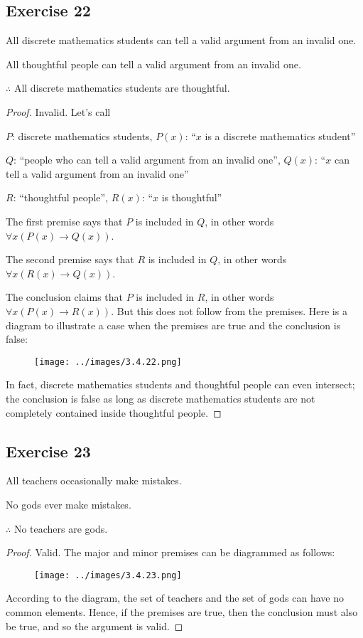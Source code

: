 \documentclass[14pt]{extarticle}
\newcommand{\fa}{\forall}
\begin{document}
\subsection{Exercise 22}
All discrete mathematics students can tell a valid argument from an invalid one.

All thoughtful people can tell a valid argument from an invalid one.

$\therefore$ All discrete mathematics students are thoughtful.

\begin{proof}
    Invalid. Let's call

    $P$: discrete mathematics students, $P(x)$: ``$x$ is a discrete mathematics student''

    $Q$: ``people who can tell a valid argument from an invalid one'', $Q(x)$: ``$x$ can tell a valid argument from an invalid one''

    $R$: ``thoughtful people'', $R(x)$: ``$x$ is thoughtful''

    The first premise says that $P$ is included in $Q$, in other words $\fa x (P(x) \to Q(x))$.

    The second premise says that $R$ is included in $Q$, in other words $\fa x (R(x) \to Q(x))$.

    The conclusion claims that $P$ is included in $R$, in other words $\fa x (P(x) \to R(x))$. But this does not follow from the premises. Here is a diagram to illustrate a case when the premises are true and the conclusion is false:

    \begin{figure}[ht!]
        \centering
        \texttt{[image: ../images/3.4.22.png]}
    \end{figure}

    In fact, discrete mathematics students and thoughtful people can even intersect; the conclusion is false as long as discrete mathematics students are not completely contained inside thoughtful people.
\end{proof}

\subsection{Exercise 23}
All teachers occasionally make mistakes.

No gods ever make mistakes.

$\therefore$ No teachers are gods.

\begin{proof}
    Valid. The major and minor premises can be diagrammed as follows:

    \begin{figure}[ht!]
        \centering
        \texttt{[image: ../images/3.4.23.png]}
    \end{figure}

    According to the diagram, the set of teachers and the set of gods can have no common elements. Hence, if the premises are true, then the conclusion must also be true, and so the argument is valid.
\end{proof}
\end{document}
